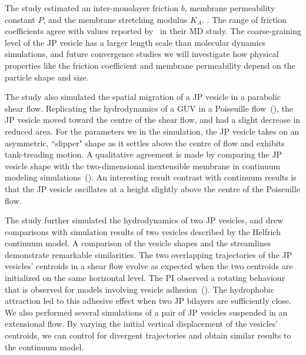 %
%
The study estimated an inter-monolayer friction $b$, membrane permeability
constant $P$, and the membrane stretching modulus $K_A$.
\cite{chabanon2017, sch_vla_mik2010}.
The range of friction coefficients agree with values reported
by~\cite{denOtter2007} in their MD study. The coarse-graining level of
the JP vesicle has a larger length scale than molecular dynamics
simulations, and future convergence studies we will investigate
how physical properties like the friction coefficient and membrane
permeability depend on the particle shape and size.

The study also simulated the spatial migration of a JP vesicle in a
parabolic shear flow. 
%
Replicating the hydrodynamics of a GUV in a Poiseuille
flow~(\cite{Kaoui09, dan_vla_mis2009, cou_kao_pod_mis2008}), the JP
vesicle moved toward the centre of the shear flow,
and had a slight decrease in reduced area.
For the parameters we in the simulation,
the JP vesicle takes on an asymmetric, ``slipper" shape as it settles
above the centre of flow and exhibits tank-treading motion.
A qualitative
agreement is made by comparing the JP vesicle shape with the
two-dimensional inextensible membrane in continuum modeling
simulations~(\cite{Kaoui09, dan_vla_mis2009, cou_kao_pod_mis2008}). 
An interesting result contrast with continuum results is that the JP
vesicle oscillates at a height slightly above the centre of the
Poiseuille flow. 


The study further simulated the hydrodynamics of two JP vesicles, and drew
comparisons with simulation results of two vesicles described by the
Helfrich continuum model. A comparison of the vesicle shapes and the
streamlines demonstrate remarkable similarities. The two overlapping
trajectories of the JP vesicles' centroids in a shear flow evolve as
expected when the two centroids are initialized on the same horizontal
level. The PI observed a rotating behaviour that is observed for models
involving vesicle adhesion~(\cite{qua_vee_you2019}). The hydrophobic
attraction led to this adhesive effect when two JP bilayers are
sufficiently close. We also performed several simulations of a pair of
JP vesicles suspended in an extensional flow. By varying the initial
vertical displacement of the vesicles' centroids, we can control for
divergent trajectories and obtain similar results to the continuum
model.

